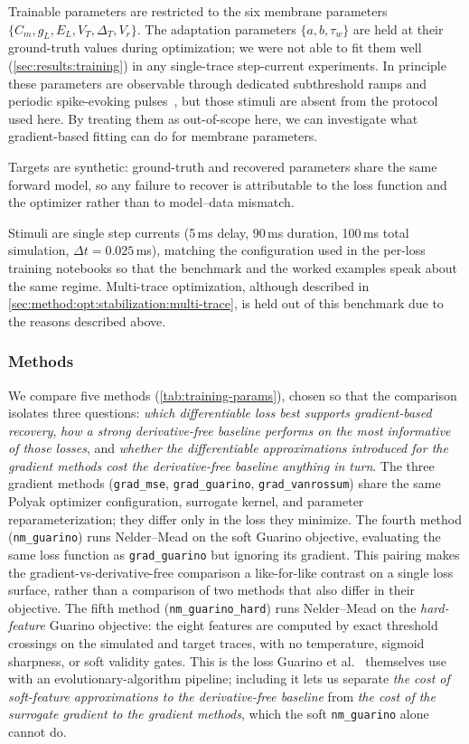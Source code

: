 Trainable parameters are restricted to the six membrane parameters $\{C_m, g_L, E_L, V_T, \Delta_T, V_r\}$.
The adaptation parameters $\{a, b, \tau_w\}$ are held at their ground-truth values during optimization;
we were not able to fit them well (\cref{sec:results:training}) in any single-trace step-current experiments.
In principle these parameters are observable through dedicated subthreshold ramps and periodic spike-evoking pulses~\cite{Brette2005}, but those stimuli are absent from the protocol used here.
By treating them as out-of-scope here, we can investigate what gradient-based fitting can do for membrane parameters.

Targets are synthetic: ground-truth and recovered parameters share the same forward model, so any failure to recover is attributable to the loss function and the optimizer rather than to model--data mismatch.

Stimuli are single step currents (5\,ms delay, 90\,ms duration, 100\,ms total simulation, $\Delta t = 0.025$\,ms), matching the configuration used in the per-loss training notebooks so that the benchmark and the worked examples speak about the same regime.
Multi-trace optimization, although described in \cref{sec:method:opt:stabilization:multi-trace}, is held out of this benchmark due to the reasons described above.

\subsubsection{Methods}\label{sec:method:opt:recovery-benchmark:methods}
We compare five methods (\cref{tab:training-params}), chosen so that the comparison isolates three questions: \emph{which differentiable loss best supports gradient-based recovery}, \emph{how a strong derivative-free baseline performs on the most informative of those losses}, and \emph{whether the differentiable approximations introduced for the gradient methods cost the derivative-free baseline anything in turn}.
The three gradient methods (\texttt{grad\_mse}, \texttt{grad\_guarino}, \texttt{grad\_vanrossum}) share the same Polyak optimizer configuration, surrogate kernel, and parameter reparameterization;
they differ only in the loss they minimize.
The fourth method (\texttt{nm\_guarino}) runs Nelder--Mead on the soft Guarino objective, evaluating the same loss function as \texttt{grad\_guarino} but ignoring its gradient.
This pairing makes the gradient-vs-derivative-free comparison a like-for-like contrast on a single loss surface, rather than a comparison of two methods that also differ in their objective.
The fifth method (\texttt{nm\_guarino\_hard}) runs Nelder--Mead on the \emph{hard-feature} Guarino objective: the eight features are computed by exact threshold crossings on the simulated and target traces, with no temperature, sigmoid sharpness, or soft validity gates.
This is the loss Guarino et al.~\cite{Guarino2025} themselves use with an evolutionary-algorithm pipeline;
including it lets us separate \emph{the cost of soft-feature approximations to the derivative-free baseline} from \emph{the cost of the surrogate gradient to the gradient methods}, which the soft \texttt{nm\_guarino} alone cannot do.

